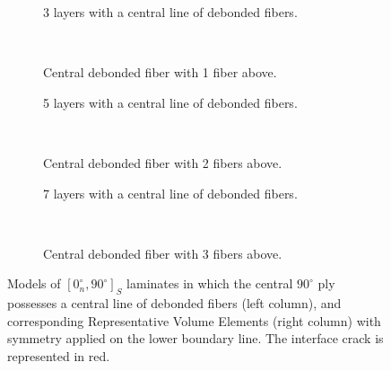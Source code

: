 \documentclass[review]{elsarticle}
\begin{document}
\begin{figure}[!h]
\centering
    \begin{subfigure}[b]{0.45\textwidth}
        \caption{3 layers with a central line of debonded fibers.}\label{subfig:3layers}
    \end{subfigure} ~
    \begin{subfigure}[b]{0.45\textwidth}
        \caption{Central debonded fiber with 1 fiber above.}\label{subfig:1above}
    \end{subfigure}

    \begin{subfigure}[b]{0.45\textwidth}
        \caption{5 layers with a central line of debonded fibers.}\label{subfig:5layers}
    \end{subfigure} ~
    \begin{subfigure}[b]{0.45\textwidth}
        \caption{Central debonded fiber with 2 fibers above.}\label{subfig:1above}
    \end{subfigure}

    \begin{subfigure}[b]{0.45\textwidth}
        \caption{7 layers with a central line of debonded fibers.}\label{subfig:7layers}
    \end{subfigure} ~
    \begin{subfigure}[b]{0.45\textwidth}
        \caption{Central debonded fiber with 3 fibers above.}\label{subfig:1above}
    \end{subfigure}
\caption{Models of $\left[0^{\circ}_{n}, 90^{\circ}\right]_{S}$ laminates in which the central $90^{\circ}$ ply possesses a central line of debonded fibers (left column), and corresponding Representative Volume Elements (right column) with symmetry applied on the lower boundary line. The interface crack is represented in red.}\label{fig:fibersOnTopModels}
\end{figure}
\end{document}
